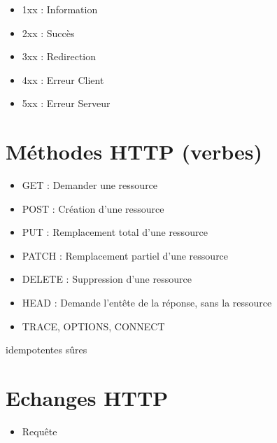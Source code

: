 \begin{itemize}
\tightlist
\item
  1xx : Information
\item
  2xx : Succès
\item
  3xx : Redirection
\item
  4xx : Erreur Client
\item
  5xx : Erreur Serveur
\end{itemize}

\hypertarget{muxe9thodes-http-verbes}{%
\section{Méthodes HTTP (verbes)}\label{muxe9thodes-http-verbes}}

\begin{itemize}
\tightlist
\item
  {GET} : Demander une ressource
\item
  POST : Création d'une ressource
\item
  {PUT} : Remplacement total d'une ressource
\item
  PATCH : Remplacement partiel d'une ressource
\item
  {DELETE} : Suppression d'une ressource
\item
  {HEAD} : Demande l'entête de la réponse, sans la ressource
\item
  {TRACE, OPTIONS}, CONNECT
\end{itemize}

{idempotentes} {sûres}

\hypertarget{echanges-http}{%
\section{Echanges HTTP}\label{echanges-http}}

\begin{itemize}
\tightlist
\item
  Requête
\end{itemize}

\begin{otherlanguage}{english}

\begin{Shaded}
\begin{Highlighting}[]
\NormalTok{[CRLF]}
\end{Highlighting}
\end{Shaded}

\end{otherlanguage}

